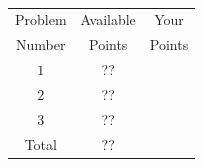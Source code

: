 \documentclass[]{exam}
\numberwithin{equation}{section}
\begin{document}
\clearpage
\normalsize
\
\vspace{.5cm}

\huge
\begin{center}
\begin{tabular}{|c|c|c|}
\hline
Problem  & Available  &   Your  \\
Number & Points &    Points  \\	\hline\hline

 $1$  & ??  &   \\	\hline
 $2$  & ??  &   \\	\hline
 $3$  & ?? &   \\	\hline

Total & ??  & \\ \hline
\end{tabular}
\end{center}

\pagebreak
\end{document}

